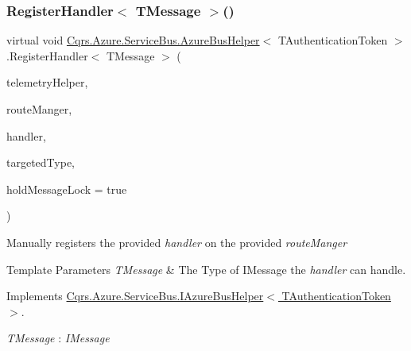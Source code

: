 \subsubsection{\texorpdfstring{Register\+Handler$<$ T\+Message $>$()}{RegisterHandler< TMessage >()}}
{\footnotesize\ttfamily virtual void \hyperlink{classCqrs_1_1Azure_1_1ServiceBus_1_1AzureBusHelper}{Cqrs.\+Azure.\+Service\+Bus.\+Azure\+Bus\+Helper}$<$ T\+Authentication\+Token $>$.Register\+Handler$<$ T\+Message $>$ (\begin{DoxyParamCaption}\item[{I\+Telemetry\+Helper}]{telemetry\+Helper,  }\item[{\hyperlink{classCqrs_1_1Bus_1_1RouteManager}{Route\+Manager}}]{route\+Manger,  }\item[{Action$<$ T\+Message $>$}]{handler,  }\item[{Type}]{targeted\+Type,  }\item[{bool}]{hold\+Message\+Lock = {\ttfamily true} }\end{DoxyParamCaption})\hspace{0.3cm}{\ttfamily [virtual]}}



Manually registers the provided {\itshape handler}  on the provided {\itshape route\+Manger}  


\begin{DoxyTemplParams}{Template Parameters}
{\em T\+Message} & The Type of I\+Message the {\itshape handler}  can handle.\\
\hline
\end{DoxyTemplParams}


Implements \hyperlink{interfaceCqrs_1_1Azure_1_1ServiceBus_1_1IAzureBusHelper_a1fe0ff74b4e5cce3d0b5a81dbaa273e0_a1fe0ff74b4e5cce3d0b5a81dbaa273e0}{Cqrs.\+Azure.\+Service\+Bus.\+I\+Azure\+Bus\+Helper$<$ T\+Authentication\+Token $>$}.

\begin{Desc}
\item[Type Constraints]\begin{description}
\item[{\em T\+Message} : {\em I\+Message}]\end{description}
\end{Desc}
\mbox{\label{classCqrs_1_1Azure_1_1ServiceBus_1_1AzureBusHelper_a6f35e150ca60f71a73c2f9a6e03f9f56_a6f35e150ca60f71a73c2f9a6e03f9f56}} 
